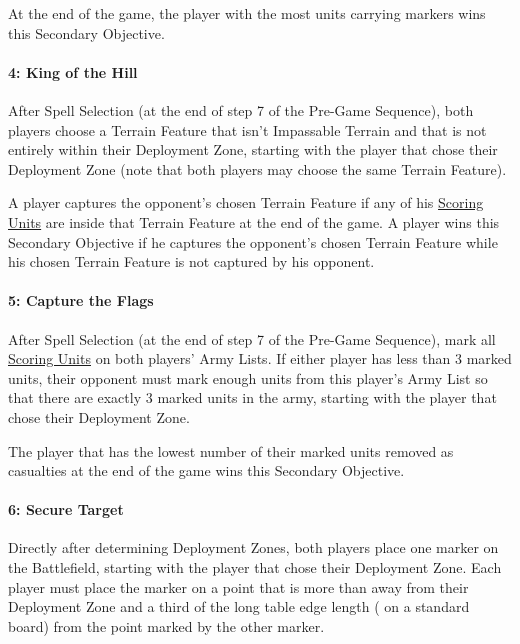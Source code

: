 At the end of the game, the player with the most units carrying markers wins this Secondary Objective.

\paragraph{4: King of the Hill}

\newline
After Spell Selection (at the end of step 7 of the Pre-Game Sequence), both players choose a Terrain Feature that isn't Impassable Terrain and that is not entirely within their Deployment Zone, starting with the player that chose their Deployment Zone (note that both players may choose the same Terrain Feature).

A player captures the opponent's chosen Terrain Feature if any of his \hyperref[scoring]{Scoring Units} are inside that Terrain Feature at the end of the game. A player wins this Secondary Objective if he captures the opponent's chosen Terrain Feature while his chosen Terrain Feature is not captured by his opponent.

\paragraph{5: Capture the Flags}

\newline
After Spell Selection (at the end of step 7 of the Pre-Game Sequence), mark all \hyperref[scoring]{Scoring Units} on both players' Army Lists. If either player has less than 3 marked units, their opponent must mark enough units from this player's Army List so that there are exactly 3 marked units in the army, starting with the player that chose their Deployment Zone.

The player that has the lowest number of their marked units removed as casualties at the end of the game wins this Secondary Objective.

\paragraph{6: Secure Target}

\newline
Directly after determining Deployment Zones, both players place one marker on the Battlefield, starting with the player that chose their Deployment Zone. Each player must place the marker on a point that is more than  away from their Deployment Zone and a third of the long table edge length ( on a standard board) from the point marked by the other marker.

